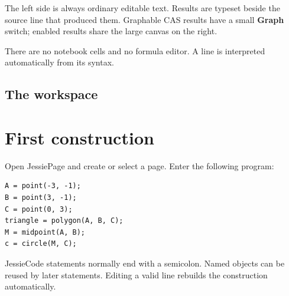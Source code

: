 \documentclass[11pt,a4paper]{article}
\newcommand{\ui}[1]{\textsf{\textbf{#1}}}
\begin{document}
The left side is always ordinary editable text. Results are typeset beside the source line that produced them. Graphable CAS results have a small \ui{Graph} switch; enabled results share the large canvas on the right.

There are no notebook cells and no formula editor. A line is interpreted automatically from its syntax.

\subsection{The workspace}

\begin{center}
\end{center}

\section{First construction}

Open JessiePage and create or select a page. Enter the following program:

\begin{lstlisting}[style=jessie]
A = point(-3, -1);
B = point(3, -1);
C = point(0, 3);
triangle = polygon(A, B, C);
M = midpoint(A, B);
c = circle(M, C);
\end{lstlisting}

JessieCode statements normally end with a semicolon. Named objects can be reused by later statements. Editing a valid line rebuilds the construction automatically.
\end{document}
